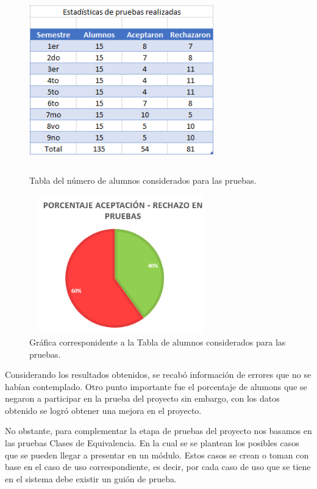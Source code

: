 	\begin{figure}[hbt!]
		\centering
		\includegraphics[width=8cm, height=8cm]{Imagenes/tablaEstadisticas}
		\caption{Tabla del número de alumnos considerados para las pruebas.}
		\label{tablaestadisticas}
	\end{figure}

	\begin{figure}[hbt!]
		\centering
		\includegraphics[width=8cm, height=6cm]{Imagenes/graficaEstadisticas}
		\caption{Gráfica corresponidente a la Tabla de alumnos considerados para las pruebas.}
		\label{graficaestadisticas}
	\end{figure}
	
	\noindent Considerando los resultados obtenidos, se recabó información de errores que no se habían contemplado. Otro punto importante fue el porcentaje de alumons que se negaron a participar en la prueba del proyecto sin embargo, con los datos obtenido se logró obtener una mejora en el proyecto. 
	
	\noindent No obstante, para complementar la etapa de pruebas del proyecto nos basamos en las pruebas Clases de Equivalencia. En la cual se se plantean los posibles casos que se pueden llegar a presentar en un módulo. Estos casos se crean o toman con base en el caso de uso correspondiente, es decir, por cada caso de uso que se tiene en el sistema debe existir un guión de prueba.\\
	
